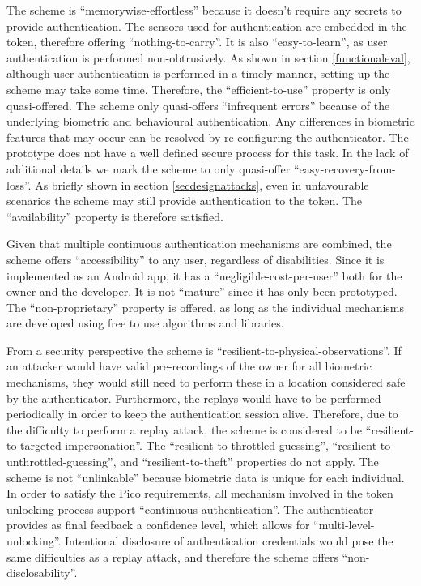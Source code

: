 The scheme is ``memorywise-effortless'' because it doesn't require any secrets to provide authentication. The sensors used for authentication are embedded in the token, therefore offering ``nothing-to-carry''. It is also ``easy-to-learn'', as user authentication is performed non-obtrusively. As shown in section \ref{functionaleval}, although user authentication is performed in a timely manner, setting up the scheme may take some time. Therefore, the ``efficient-to-use'' property is only quasi-offered.  The scheme only quasi-offers ``infrequent errors'' because of the underlying biometric and behavioural authentication. Any differences in biometric features that may occur can be resolved by re-configuring the authenticator. The prototype does not have a well defined secure process for this task. In the lack of additional details we mark the scheme to only quasi-offer ``easy-recovery-from-loss''. As briefly shown in section \ref{secdesignattacks}, even in unfavourable scenarios the scheme may still provide authentication to the token. The ``availability'' property is therefore satisfied.

Given that multiple continuous authentication mechanisms are combined, the scheme offers ``accessibility'' to any user, regardless of disabilities. Since it is implemented as an Android app, it has a ``negligible-cost-per-user'' both for the owner and the developer. It is not ``mature'' since it has only been prototyped. The ``non-proprietary'' property is offered, as long as the individual mechanisms are developed using free to use algorithms and libraries.

From a security perspective the scheme is ``resilient-to-physical-observations''. If an attacker would have valid pre-recordings of the owner for all biometric mechanisms, they would still need to perform these in a location considered safe by the authenticator. Furthermore, the replays would have to be performed periodically in order to keep the authentication session alive. Therefore, due to the difficulty to perform a replay attack, the scheme is considered to be ``resilient-to-targeted-impersonation''. The ``resilient-to-throttled-guessing'', ``resilient-to-unthrottled-guessing'', and ``resilient-to-theft'' properties do not apply. The scheme is not ``unlinkable'' because biometric data is unique for each individual. In order to satisfy the Pico requirements, all mechanism involved in the token unlocking process support ``continuous-authentication''. The authenticator provides as final feedback a confidence level, which allows for ``multi-level-unlocking''. Intentional disclosure of authentication credentials would pose the same difficulties as a replay attack, and therefore the scheme offers ``non-disclosability''.

